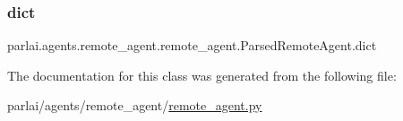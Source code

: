 \subsubsection{\texorpdfstring{dict}{dict}}
{\footnotesize\ttfamily parlai.\+agents.\+remote\+\_\+agent.\+remote\+\_\+agent.\+Parsed\+Remote\+Agent.\+dict}



The documentation for this class was generated from the following file\+:\begin{DoxyCompactItemize}
\item 
parlai/agents/remote\+\_\+agent/\hyperlink{remote__agent_8py}{remote\+\_\+agent.\+py}\end{DoxyCompactItemize}
